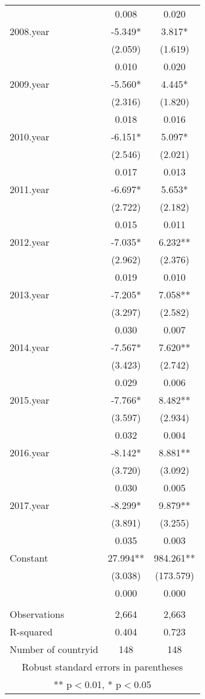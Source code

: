 \begin{tabular}{lcc}
 & 0.008 & 0.020 \\
2008.year & -5.349* & 3.817* \\
 & (2.059) & (1.619) \\
 & 0.010 & 0.020 \\
2009.year & -5.560* & 4.445* \\
 & (2.316) & (1.820) \\
 & 0.018 & 0.016 \\
2010.year & -6.151* & 5.097* \\
 & (2.546) & (2.021) \\
 & 0.017 & 0.013 \\
2011.year & -6.697* & 5.653* \\
 & (2.722) & (2.182) \\
 & 0.015 & 0.011 \\
2012.year & -7.035* & 6.232** \\
 & (2.962) & (2.376) \\
 & 0.019 & 0.010 \\
2013.year & -7.205* & 7.058** \\
 & (3.297) & (2.582) \\
 & 0.030 & 0.007 \\
2014.year & -7.567* & 7.620** \\
 & (3.423) & (2.742) \\
 & 0.029 & 0.006 \\
2015.year & -7.766* & 8.482** \\
 & (3.597) & (2.934) \\
 & 0.032 & 0.004 \\
2016.year & -8.142* & 8.881** \\
 & (3.720) & (3.092) \\
 & 0.030 & 0.005 \\
2017.year & -8.299* & 9.879** \\
 & (3.891) & (3.255) \\
 & 0.035 & 0.003 \\
Constant & 27.994** & 984.261** \\
 & (3.038) & (173.579) \\
 & 0.000 & 0.000 \\
 &  &  \\
Observations & 2,664 & 2,663 \\
R-squared & 0.404 & 0.723 \\
 Number of countryid & 148 & 148 \\ \hline
\multicolumn{3}{c}{ Robust standard errors in parentheses} \\
\multicolumn{3}{c}{ ** p$<$0.01, * p$<$0.05} \\
\end{tabular}
